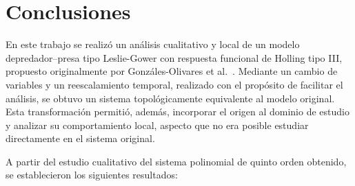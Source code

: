 %
%

\chapter{Conclusiones}

En este trabajo se realizó un análisis cualitativo y local de un modelo depredador--presa tipo Leslie-Gower con respuesta funcional de Holling tipo III, propuesto originalmente por Gonzáles-Olivares et al.~\cite{articulo}. Mediante un cambio de variables y un reescalamiento temporal, realizado con el propósito de facilitar el análisis, se obtuvo un sistema topológicamente equivalente al modelo original. Esta transformación permitió, además, incorporar el origen al dominio de estudio y analizar su comportamiento local, aspecto que no era posible estudiar directamente en el sistema original.

A partir del estudio cualitativo del sistema polinomial de quinto orden obtenido, se establecieron los siguientes resultados:

